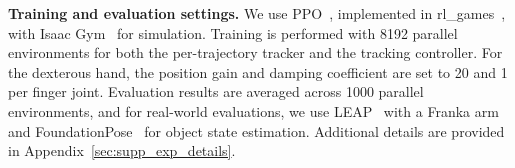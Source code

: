 \vspace{-5pt}
\noindent\textbf{Training and evaluation settings.} 
We use PPO~\citep{Schulman2017ProximalPO}, implemented in {rl\_games}~\citep{rlgames2021}, with Isaac Gym~\citep{makoviychuk2021isaac} for simulation. Training is performed with 8192 parallel environments for both the per-trajectory tracker and the tracking controller. For the dexterous hand, the position gain and damping coefficient are set to 20 and 1 per finger joint. Evaluation results are averaged across 1000 parallel environments, and for real-world evaluations, we use LEAP~\citep{Shaw2023LEAPHL} with a Franka arm and FoundationPose~\citep{Wen2023FoundationPoseU6} for object state estimation. Additional details are provided in Appendix~\ref{sec:supp_exp_details}.

